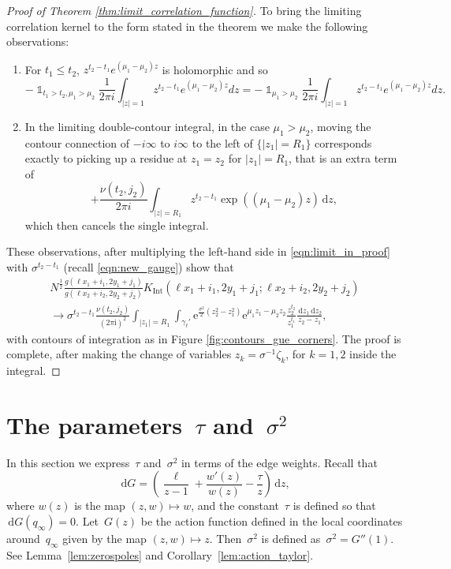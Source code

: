 \documentclass[11pt]{article}
\theoremstyle{plain}
\theoremstyle{definition}
\numberwithin{equation}{section}
\renewcommand{\d}{\,\mathrm{d}}
\renewcommand{\i}{\mathrm{i}}
\newcommand{\e}{\mathrm{e}}
\DeclareMathOperator{\one}{\mathds{1}}
\begin{document}
\begin{proof}[Proof of Theorem \ref{thm:limit_correlation_function}]
To bring the limiting correlation kernel to the form stated in the theorem we make the following observations:
\begin{enumerate}
\item
 For $t_1\leq t_2$, $ z^{t_2-t_1}
e^{(\mu_1-\mu_2) z}$ is holomorphic and so
$$- \one_{t_1>t_2, \mu_1>\mu_2}
 \frac{1}{2\pi i}\int_{|z|=1} 
 z^{t_2-t_1}
e^{(\mu_1-\mu_2) z}
dz=- \one_{\mu_1>\mu_2}
 \frac{1}{2\pi i}\int_{|z|=1} 
 z^{t_2-t_1}
e^{(\mu_1-\mu_2) z}
dz.$$
\item
In the limiting double-contour integral, in the case $\mu_1>\mu_2$, moving the contour connection of $-i\infty$ to $i\infty$ to the left of $\{|z_1|=R_1\}$ corresponds exactly to picking up a residue at $z_1=z_2$ for $|z_1|=R_1$, that is an extra term of
$$+  \frac{\nu(t_2, j_2)}{2\pi i}\int_{|z|=R_1} 
 z^{t_2-t_1}
\exp((\mu_1-\mu_2) z)
\d z,$$
which then cancels the single integral.
\end{enumerate}
These observations, after multiplying the left-hand side in \eqref{eqn:limit_in_proof} with $\sigma^{t_2-t_1}$ (recall \eqref{eqn:new_gauge}) show that
\begin{multline*}
 N^{\frac{1}{2}}
\frac{g(\ell x_1+i_1,2y_1+j_1)}{g(\ell x_2+i_2,2y_2+j_2)}
K_{\operatorname{Int}}(\ell x_1+i_1, 2y_1+j_1; \ell x_2+i_2, 2y_2+j_2 )
\\\rightarrow
\sigma^{t_2-t_1}
\frac{\nu(t_2,j_2)}{(2\pi\i)^2}
\int_{|z_1|=R_1}
\int_{\gamma_{\ell}'}
\e^{\frac{\sigma^2}{2}
(z_2^2-z_1^2)}\e^{\mu_1 z_1-\mu_2 z_2}\frac{z_2^{t_2}}{z_1^{t_1}}\frac{\d z_1\d z_2}{z_2-z_1},
\end{multline*}
with contours of integration as in Figure \ref{fig:contours_gue_corners}.
The proof is complete, after making the change of variables $z_k=\sigma^{-1}\zeta_k$, for $k=1,2$ inside the integral.
\end{proof}








\section{The parameters~$\tau $ and~$\sigma^2$}\label{sec:ty_sigma} 
In this section we express~$\tau $ and~$\sigma^2$ in terms of the edge weights. Recall that
\begin{equation}\label{eq:action_function_derivative}
\d G=\left(\frac{\ell}{z-1}+\frac{w'(z)}{w(z)}-\frac{\tau }{z}\right)\d z,
\end{equation}
where $w(z)$ is the map $(z,w)\mapsto w$, and the constant~$\tau $ is defined so that~$\d G(q_\infty)=0$. Let~$G(z)$ be the action function defined in the local coordinates around~$q_\infty$ given by the map $(z,w)\mapsto z$. Then~$\sigma^2$ is defined as~$\sigma^2=G''(1)$. See Lemma~\ref{lem:zerospoles} and Corollary~\ref{lem:action_taylor}.
 
\end{document}
